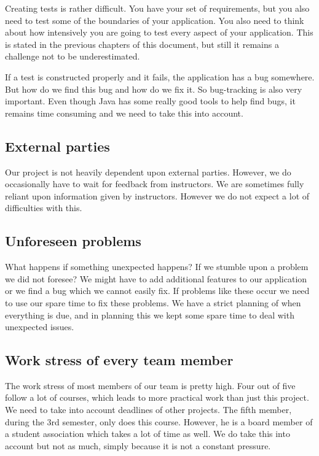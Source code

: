 \documentclass[a4paper]{article}
\begin{document}
Creating tests is rather difficult. You have your set of requirements, but you also need to test some of the boundaries of your application. You also need to think about how intensively you are going to test every aspect of your application. This is stated in the previous chapters of this document, but still it remains a challenge not to be underestimated.

If a test is constructed properly and it fails, the application has a bug somewhere. But how do we find this bug and how do we fix it. So bug-tracking is also very important. Even though Java has some really good tools to help find bugs, it remains time consuming and we need to take this into account.

\subsection{External parties}
Our project is not heavily dependent upon external parties. However, we do occasionally have to wait for feedback from instructors. We are sometimes fully reliant upon information given by instructors. However we do not expect a lot of difficulties with this.

\subsection{Unforeseen problems}
What happens if something unexpected happens? If we stumble upon a problem we did not foresee? We might have to add additional features to our application or we find a bug which we cannot easily fix. If problems like these occur we need to use our spare time to fix these problems. We have a strict planning of when everything is due, and in planning this we kept some spare time to deal with unexpected issues.

\subsection{Work stress of every team member}
The work stress of most members of our team is pretty high. Four out of five follow a lot of courses, which leads to more practical work than just this project. We need to take into account deadlines of other projects. The fifth member, during the 3rd semester, only does this course. However, he is a board member of a student association which takes a lot of time as well. We do take this into account but not as much, simply because it is not a constant pressure.
\end{document}

